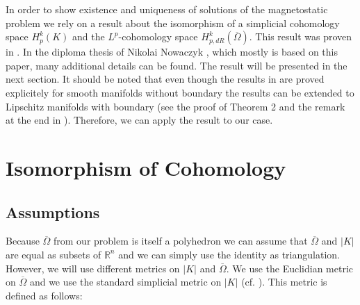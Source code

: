 \documentclass[12pt,a4paper]{article}
\theoremstyle{definition}
\newcommand{\omegabar}{\overline{\Omega}}
\newcommand{\real}{\mathbb{R}}
\begin{document}
In order to show existence and uniqueness of solutions of the magnetostatic 
problem we rely on a result about the isomorphism of a simplicial 
cohomology space $H^k_p(K)$ and the $L^p$-cohomology space 
$H^k_{p,dR}(\omegabar)$.
This result was proven in \cite{goldshtein}. In the diploma thesis of Nikolai
Nowaczyk \cite{nowaczyk}, which mostly is based on this paper, 
many additional details can be found. The result will be presented in the
next section. It should be noted that even though the results in 
\cite{goldshtein} are
proved explicitely for smooth manifolds without boundary the results can be 
extended to Lipschitz manifolds with boundary (see the proof of Theorem 2 and 
the remark at the end in \cite{goldshtein}). Therefore, we can apply the result
to our case.










\section{Isomorphism of Cohomology}

\subsection{Assumptions}
Because $\omegabar$ from our problem is itself a polyhedron we can
assume that $\omegabar$ and $|K|$ are equal as subsets of $\real^n$ and we can
simply use the identity as triangulation.
However, we will use different metrics on $|K|$ and $\omegabar$. 
We use the Euclidian metric on 
$\omegabar$ and we use the standard simplicial metric on $|K|$ (cf. 
\cite[p.191]{goldshtein}). This metric is defined as follows:
\end{document}
